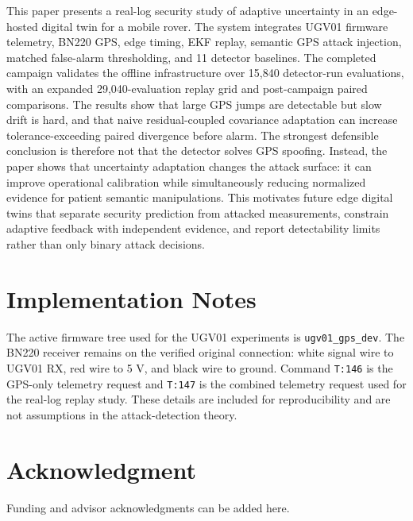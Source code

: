 \documentclass[conference]{IEEEtran}
\begin{document}
This paper presents a real-log security study of adaptive uncertainty in an
edge-hosted digital twin for a mobile rover. The system integrates UGV01
firmware telemetry, BN220 GPS, edge timing, EKF replay, semantic GPS attack
injection, matched false-alarm thresholding, and 11 detector baselines. The
completed campaign validates the offline infrastructure over 15,840 detector-run
evaluations, with an expanded 29,040-evaluation replay grid and post-campaign
paired comparisons. The results show that large GPS jumps are detectable but
slow drift is hard, and that naive residual-coupled covariance adaptation can
increase tolerance-exceeding paired divergence before alarm. The strongest
defensible conclusion is therefore not that the detector solves GPS spoofing.
Instead, the paper shows that uncertainty adaptation changes the attack
surface: it can improve operational calibration while simultaneously reducing
normalized evidence for patient semantic manipulations. This motivates future
edge digital twins that separate security prediction from attacked
measurements, constrain adaptive feedback with independent evidence, and
report detectability limits rather than only binary attack decisions.

\appendices
\section{Implementation Notes}

The active firmware tree used for the UGV01 experiments is
\texttt{ugv01\_gps\_dev}. The BN220 receiver remains on the verified original
connection: white signal wire to UGV01 RX, red wire to 5 V, and black wire to
ground. Command \texttt{T:146} is the GPS-only telemetry request and
\texttt{T:147} is the combined telemetry request used for the real-log replay
study. These details are included for reproducibility and are not assumptions
in the attack-detection theory.

\section*{Acknowledgment}

Funding and advisor acknowledgments can be added here.
\end{document}
